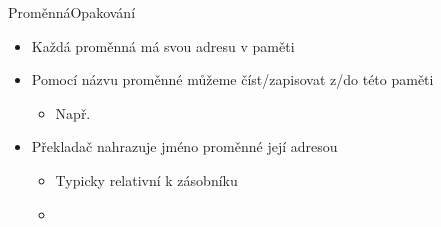 \begin{frame}{Proměnná}{Opakování}

  \begin{itemize}
    \item Každá proměnná má svou adresu v paměti

    \pause

    \item Pomocí názvu proměnné můžeme číst/zapisovat z/do této paměti
    \begin{itemize}
      \item Např.\ 
    \end{itemize}

    \pause

    \item Překladač nahrazuje jméno proměnné její adresou
    \begin{itemize}
      \item Typicky relativní k zásobníku
      \item {}
    \end{itemize}
  \end{itemize}

\end{frame}

%
%

